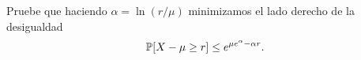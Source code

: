 \begin{statement}{32}
  Pruebe que haciendo $\alpha = \ln(r / \mu)$ minimizamos el lado derecho de la desigualdad
  \[
    \mathbb{P}[X - \mu \geq r]   \leq e^{\mu e^{\alpha} - \alpha r}.
  \]
\end{statement}
